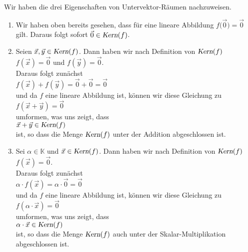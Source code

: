 \proof
Wir haben die drei Eigenschaften von Untervektor-R\"{a}umen nachzuweisen. 
\begin{enumerate}
\item Wir haben oben bereits gesehen, dass f\"{u}r eine lineare Abbildung
      $f\bigl(\vec{0}\bigr) = \vec{0}$ gilt.  Daraus folgt sofort $\vec{0} \in \textsl{Kern}(f)$.
\item Seien $\vec{x}, \vec{y} \in \textsl{Kern}(f)$.  Dann haben wir nach Definition von $\textsl{Kern}(f)$
      \\[0.2cm]
      \hspace*{1.3cm}
      $f(\vec{x}) = \vec{0}$ \quad und \quad $f(\vec{y}) = \vec{0}$. 
      \\[0.2cm]
      Daraus folgt zun\"{a}chst
      \\[0.2cm]
      \hspace*{1.3cm}
      $f(\vec{x}) + f(\vec{y}) = \vec{0} + \vec{0} = \vec{0}$
      \\[0.2cm]
      und da $f$ eine lineare Abbildung ist, k\"{o}nnen wir diese Gleichung zu
      \\[0.2cm]
      \hspace*{1.3cm}
      $f(\vec{x} + \vec{y}) = \vec{0}$
      \\[0.2cm]
      umformen, was uns zeigt, dass
      \\[0.2cm]
      \hspace*{1.3cm}
      $\vec{x} + \vec{y} \in \textsl{Kern}(f)$ 
      \\[0.2cm]
      ist, so dass die Menge $\textsl{Kern}(f)$ unter der Addition abgeschlossen ist.
\item Sei $\alpha \in \mathbb{K}$ und $\vec{x} \in \textsl{Kern}(f)$.  Dann haben wir nach Definition von $\textsl{Kern}(f)$
      \\[0.2cm]
      \hspace*{1.3cm}
      $f(\vec{x}) = \vec{0}$. 
      \\[0.2cm]
      Daraus folgt zun\"{a}chst
      \\[0.2cm]
      \hspace*{1.3cm}
      $\alpha \cdot f(\vec{x}) = \alpha \cdot \vec{0} = \vec{0}$
      \\[0.2cm]
      und da $f$ eine lineare Abbildung ist, k\"{o}nnen wir diese Gleichung zu
      \\[0.2cm]
      \hspace*{1.3cm}
      $f(\alpha \cdot \vec{x}) = \vec{0}$
      \\[0.2cm]
      umformen, was uns zeigt, dass
      \\[0.2cm]
      \hspace*{1.3cm}
      $\alpha \cdot \vec{x} \in \textsl{Kern}(f)$ 
      \\[0.2cm]
      ist, so dass die Menge $\textsl{Kern}(f)$ auch unter der Skalar-Multiplikation abgeschlossen ist. \qeds
\end{enumerate}

